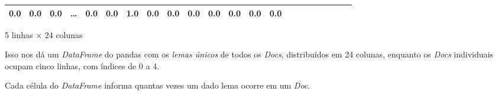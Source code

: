 \documentclass[
  brazilian,
]{article}
\begin{document}
\begin{longtable}[]{@{}llllllllllllllllllllll@{}}
\begin{minipage}[t]{0.03\columnwidth}
0.0\strut
\end{minipage} & \begin{minipage}[t]{0.02\columnwidth}\raggedright
0.0\strut
\end{minipage} & \begin{minipage}[t]{0.03\columnwidth}\raggedright
0.0\strut
\end{minipage} & \begin{minipage}[t]{0.02\columnwidth}\raggedright
\ldots{}\strut
\end{minipage} & \begin{minipage}[t]{0.02\columnwidth}\raggedright
0.0\strut
\end{minipage} & \begin{minipage}[t]{0.03\columnwidth}\raggedright
0.0\strut
\end{minipage} & \begin{minipage}[t]{0.02\columnwidth}\raggedright
1.0\strut
\end{minipage} & \begin{minipage}[t]{0.02\columnwidth}\raggedright
0.0\strut
\end{minipage} & \begin{minipage}[t]{0.02\columnwidth}\raggedright
0.0\strut
\end{minipage} & \begin{minipage}[t]{0.02\columnwidth}\raggedright
0.0\strut
\end{minipage} & \begin{minipage}[t]{0.02\columnwidth}\raggedright
0.0\strut
\end{minipage} & \begin{minipage}[t]{0.02\columnwidth}\raggedright
0.0\strut
\end{minipage} & \begin{minipage}[t]{0.03\columnwidth}\raggedright
0.0\strut
\end{minipage} & \begin{minipage}[t]{0.02\columnwidth}\raggedright
0.0\strut
\end{minipage}\tabularnewline
\bottomrule
\end{longtable}

5 linhas × 24 colunas

Isso nos dá um \emph{DataFrame} do pandas com os \emph{lemas únicos} de
todos os \emph{Docs}, distribuídos em 24 colunas, enquanto os
\emph{Docs} individuais ocupam cinco linhas, com índices de 0 a 4.

Cada célula do \emph{DataFrame} informa quantas vezes um dado lema
ocorre em um \emph{Doc}.
\end{document}
